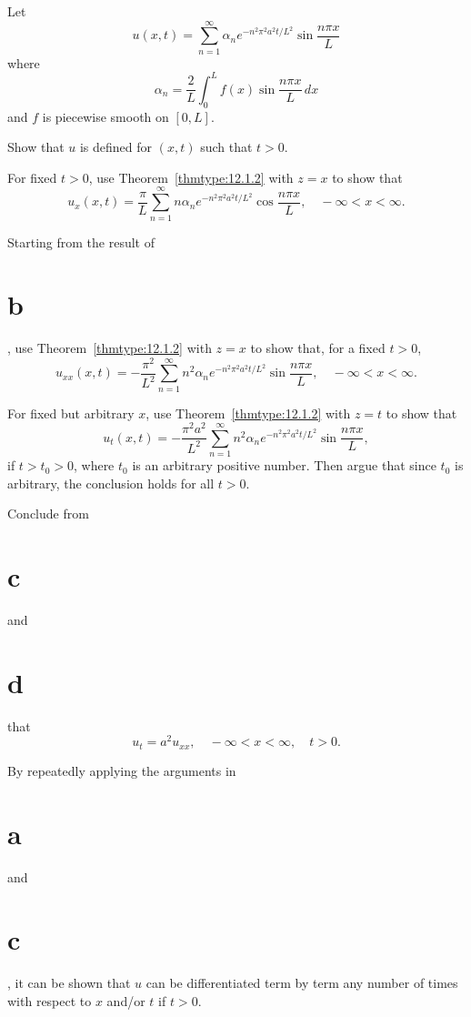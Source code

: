 \begin{exerciselist}
  Let
  \[
    u(x,t)=\sum_{n=1}^{\infty}\alpha_{n}e^{-n^{2}\pi^{2} a^{2}t/L^{2}}\sin\frac{n\pi x}{L}
  \]
  where
  \[
    \alpha_{n}=\frac{2}{L}\int_{0}^{L}f(x)\sin\frac{n\pi x}{L}\,dx
  \]
  and $f$ is piecewise smooth on $[0,L]$.

  \begin{alist}
    \item %
    Show that $u$ is defined for $(x,t)$ such that $t>0$.

    \item %
    For fixed $t>0$, use Theorem~\ref{thmtype:12.1.2} with $z=x$ to show that
    \[
      u_{x}(x,t)=\frac{\pi}{L}\sum_{n=1}^{\infty}n\alpha_{n}e^{-n^{2}\pi^{2} a^{2}t/L^{2}}\cos\frac{n\pi x}{L},\quad-\infty<x<\infty.
    \]

    \item %
    Starting from the result of \part{b}, use Theorem~\ref{thmtype:12.1.2} with $z=x$ to show that,
    for a fixed $t>0$,
    \[
      u_{xx}(x,t)=-\frac{\pi^{2}}{L^{2}}\sum_{n=1}^{\infty}n^{2}\alpha_{n}e^{-n^{2}\pi^{2}a^{2}t/L^{2}}\sin\frac{n\pi x}{L},\quad-\infty<x<\infty.
    \]

    \item %
    For fixed but arbitrary $x$, use Theorem~\ref{thmtype:12.1.2} with $z=t$ to show that
    \[
      u_{t}(x,t)=-\frac{\pi^{2}a^{2}}{L^{2}}\sum_{n=1}^{\infty}n^{2}\alpha_{n}e^{-n^{2}\pi^{2}a^{2}t/L^{2}}\sin\frac{n\pi x}{L},
    \]
    if $t>t_{0}>0$, where $t_{0}$ is an arbitrary positive number. Then argue that since $t_{0}$ is
    arbitrary, the conclusion holds for all $t>0$.

    \item %
    Conclude from \part{c} and \part{d} that
    \[
      u_{t}=a^{2}u_{xx},\quad-\infty<x<\infty,\quad t>0.
    \]
  \end{alist}

  By repeatedly applying the arguments in \part{a} and \part{c}, it can be shown that $u$ can be
  differentiated term by term any number of times with respect to $x$ and/or $t$ if $t>0$.
\end{exerciselist}

